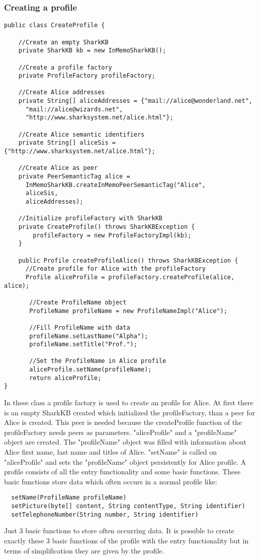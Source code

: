\documentclass[12pt]{article}
\begin{document}
\subsubsection{Creating a profile}
\begin{verbatim}
public class CreateProfile {

    //Create an empty SharkKB
    private SharkKB kb = new InMemoSharkKB();
    
    //Create a profile factory
    private ProfileFactory profileFactory;
    
    //Create Alice addresses
    private String[] aliceAddresses = {"mail://alice@wonderland.net",
      "mail://alice@wizards.net",
      "http://www.sharksystem.net/alice.html"};
    
    //Create Alice semantic identifiers 
    private String[] aliceSis = {"http://www.sharksystem.net/alice.html"};
    
    //Create Alice as peer
    private PeerSemanticTag alice = 
      InMemoSharkKB.createInMemoPeerSemanticTag("Alice",
      aliceSis,
      aliceAddresses);
            
    //Initialize profileFactory with SharkKB
    private CreateProfile() throws SharkKBException {
        profileFactory = new ProfileFactoryImpl(kb);
    }

    public Profile createProfileAlice() throws SharkKBException {
      //Create profile for Alice with the profileFactory
      Profile aliceProfile = profileFactory.createProfile(alice, alice);

       //Create ProfileName object
       ProfileName profileName = new ProfileNameImpl("Alice");
	
       //Fill ProfileName with data
       profileName.setLastName("Alpha");
       profileName.setTitle("Prof.");
	
       //Set the ProfileName in Alice profile
       aliceProfile.setName(profileName);
       return aliceProfile;
}
\end{verbatim}

In these class a profile factory is used to create an profile for Alice. At first there is an empty SharkKB created which initialized the profileFactory, than a peer for Alice is created.
This peer is needed because the createProfile function of the profileFactory needs peers as parameters. "aliceProfile" and a "profileName" object are created. The "profileName" object was filled with information about Alice first name, last name and titles of Alice. "setName" is called on "aliceProfile" and sets the "profileName" object persistently for Alice profile.
A profile consists of all the entry functionality and some basic functions. These basic functions store data which often occurs in a normal profile like:
\begin{verbatim}
  setName(ProfileName profileName)   
  setPicture(byte[] content, String contentType, String identifier)
  setTelephoneNumber(String number, String identifier)
\end{verbatim}
Just 3 basic functions to store often occurring data. It is possible to create exactly these 3 basic functions of the profile with the entry functionality but in terms of simplification they are given by the profile.
\end{document}
